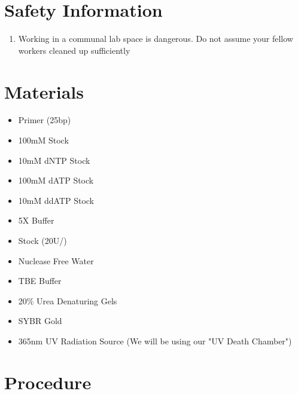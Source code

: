 \documentclass{ssiBio}
\begin{document}
\section{Safety Information}
\begin{safety}
\begin{enumerate}
\SYBRGOLD{} %
\tdtSafety{} 
\tdtBufferSafety{}
\item{Working in a communal lab space is dangerous. Do not assume your fellow workers cleaned up sufficiently}
\end{enumerate}
\end{safety}

\section{Materials}
\begin{itemize}
\item{Primer (25bp)}
\item{100mM \BdATP{} Stock}
\item{10mM dNTP Stock}
\item{100mM dATP Stock}
\item{10mM ddATP Stock}
\item{5X \tdt{} Buffer}
\item{\tdt{} Stock (20U/\uL{})} %
\item{Nuclease Free Water}
\item{TBE Buffer}
\item{20\% Urea Denaturing Gels}
\item{SYBR Gold}
\item{365nm UV Radiation Source (We will be using our "UV Death Chamber")}
\end{itemize}

\section{Procedure}%
\end{document}
